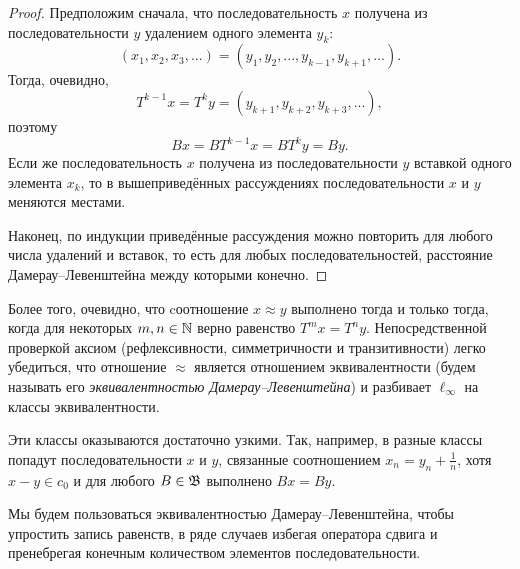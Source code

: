 \begin{proof}
	Предположим сначала, что последовательность $x$ получена из последовательности $y$ удалением одного элемента $y_k$:
	\begin{equation}
		(x_1, x_2, x_3,...) = (y_1, y_2, ..., y_{k-1}, y_{k+1}, ...)
		.
	\end{equation}
	Тогда, очевидно,
	\begin{equation}
		T^{k-1} x = T^{k}y = (y_{k+1}, y_{k+2}, y_{k+3}, ...)
		,
	\end{equation}
	поэтому
	\begin{equation}
		Bx = BT^{k-1}x = BT^{k}y = By
		.
	\end{equation}
	Если же последовательность $x$ получена из последовательности $y$ вставкой одного элемента $x_k$,
	то в вышеприведённых рассуждениях последовательности $x$ и $y$ меняются местами.

	Наконец, по индукции приведённые рассуждения можно повторить для любого числа удалений и вставок,
	то есть для любых последовательностей, расстояние Дамерау--Левенштейна между которыми конечно.
\end{proof}

Более того, очевидно, что
	cоотношение $x\approx y$ выполнено тогда и только тогда, когда для некоторых $m,n\in\mathbb{N}$ верно равенство $T^m x = T^n y$.
Непосредственной проверкой аксиом (рефлексивности, симметричности и транзитивности) легко убедиться,
что отношение $\approx$ является отношением эквивалентности (будем называть его \emph{эквивалентностью Дамерау--Левенштейна})
и разбивает $\ell_\infty$ на классы эквивалентности.

\begin{remark}
	\label{rem:Damerau_vs_c0}
	Эти классы оказываются достаточно узкими.
	Так, например, в разные классы попадут последовательности $x$ и $y$, связанные соотношением $x_n = y_n + \frac1n$,
	хотя $x-y \in c_0$ и для любого $B\in\mathfrak{B}$ выполнено $Bx=By$.
\end{remark}

Мы будем пользоваться эквивалентностью Дамерау--Левенштейна, чтобы упростить запись равенств,
в ряде случаев избегая оператора сдвига и пренебрегая конечным количеством элементов последовательности.
